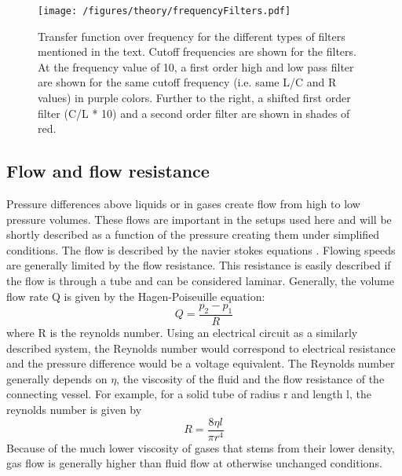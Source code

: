             \begin{figure}
                \label{figure:theory:frequencyFilter}
                \centering
                \texttt{[image: /figures/theory/frequencyFilters.pdf]}
                \caption[Frequency filters]{Transfer function over frequency for the different types of filters mentioned in the text. Cutoff frequencies are shown for the filters. At the frequency value of 10, a first order high and low pass filter are shown for the same cutoff frequency (i.e. same L/C and R values) in purple colors. Further to the right, a shifted first order filter (C/L * 10) and a second order filter are shown in shades of red.}
            \end{figure}
            \subsection{Flow and flow resistance}
                Pressure differences above liquids or in gases create flow from high to low pressure volumes. These flows are important in the setups used here and will be shortly described as a function of the pressure creating them under simplified conditions. The flow is described by the navier stokes equations \cite{sochi_flow_2013}.
                Flowing speeds are generally limited by the flow resistance. This resistance is easily described if the flow is through a tube and can be considered laminar. Generally, the volume flow rate Q is given by the Hagen-Poiseuille equation:
                \begin{equation}
                    Q=\frac{p_2-p_1}{R}
                \end{equation}
                where R is the reynolds number. Using an electrical circuit as a similarly described system, the Reynolds number would correspond to electrical resistance and the pressure difference would be a voltage equivalent. The Reynolds number generally depends on $\eta$, the viscosity of the fluid and the flow resistance of the connecting vessel. For example, for a solid tube of radius r and length l, the reynolds number is given by \cite{jeffrey_particle_1965}
                \begin{equation}
                    R=\frac{8\eta l}{\pi r^4}
                \end{equation}
                Because of the much lower viscosity of gases that stems from their lower density, gas flow is generally higher than fluid flow at otherwise unchanged conditions.
